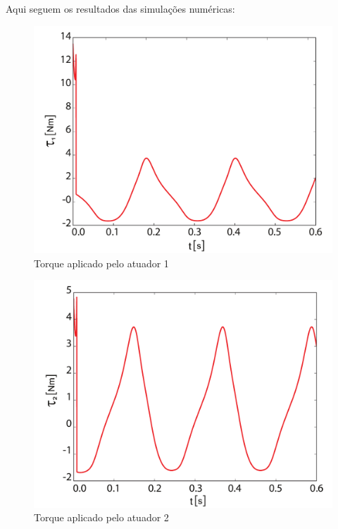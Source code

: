 \documentclass[]{politex}
\begin{document}
Aqui seguem os resultados das simulações numéricas:

\newpage

\begin{multicols}{2}
\begin{figure}[H]
	\centering
	\includegraphics[scale=0.31]{../figures/Torque1.pdf}  
	\caption{Torque aplicado pelo atuador 1}
	\label{fig:Torque1}
\end{figure}

\begin{figure}[H]
	\centering
	\includegraphics[scale=0.31]{../figures/Torque2.pdf}  
	\caption{Torque aplicado pelo atuador 2}
	\label{fig:Torque2}
\end{figure}
\end{multicols}
\end{document}
